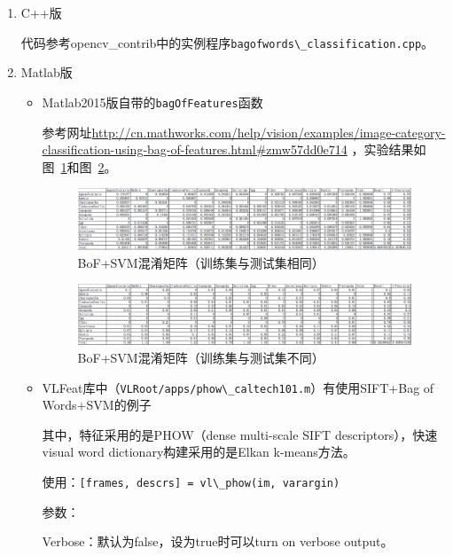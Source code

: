 \documentclass[12pt]{article}
\begin{document}
\begin{enumerate}

\item C++版

代码参考opencv\_contrib中的实例程序\verb|bagofwords\_classification.cpp|。

\item Matlab版

\begin{itemize}

\item Matlab2015版自带的\verb|bagOfFeatures|函数

参考网址\url{http://cn.mathworks.com/help/vision/examples/image-category-classification-using-bag-of-features.html#zmw57dd0e714} ，实验结果如图~\ref{fig:Train-CM-BoF-SVM-Linear}和图~\ref{fig:Test-CM-BoF-SVM-Linear}。

\begin{figure}[!ht]
\centering
\includegraphics[width=1.0\linewidth]{Train-CM-BoF-SVM-Linear}
\caption{BoF+SVM混淆矩阵（训练集与测试集相同）}
\label{fig:Train-CM-BoF-SVM-Linear}
\end{figure}

\begin{figure}[!ht]
\centering
\includegraphics[width=1.0\linewidth]{Test-CM-BoF-SVM-Linear}
\caption{BoF+SVM混淆矩阵（训练集与测试集不同）}
\label{fig:Test-CM-BoF-SVM-Linear}
\end{figure}

\item VLFeat库中（\verb|VLRoot/apps/phow\_caltech101.m|）有使用SIFT+Bag of Words+SVM的例子

其中，特征采用的是PHOW（dense multi-scale SIFT descriptors），快速visual word dictionary构建采用的是Elkan k-means方法。

使用：\verb|[frames, descrs] = vl\_phow(im, varargin)|

参数：

Verbose：默认为false，设为true时可以turn on verbose output。


\end{itemize}
\end{enumerate}
\end{document}
